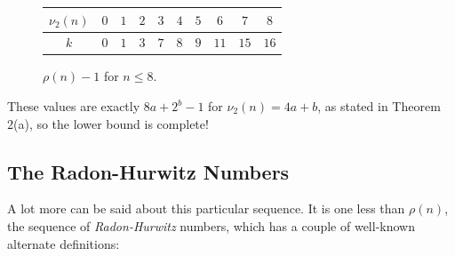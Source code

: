 \documentclass{amsart}
\begin{document}
\begin{figure}[h]
	\begin{center}
		{\tabulinesep=0.6mm
			\begin{tabu}{|c||c|c|c|c|c|c|c|c|c|}
				\hline 
				$\nu_2(n)$ & $0$& $1$& $2$& $3$& $4$& $5$& $6$ &$7$ & $8$\\
				\hline
				$k$ & $0$ & $1$ & $3$ & $7$ & $8$& $9$& $11$ & $15$ & $16$\\
				\hline
		\end{tabu}}
	\end{center}
	\caption{$\rho(n) - 1$ for $n\leq 8$.}
\end{figure}
These values are exactly $8a+2^b - 1$ for $\nu_2(n)=4a+b$, as stated in Theorem 2(a), so the lower bound is complete!\\

\subsection{The Radon-Hurwitz Numbers}
A lot more can be said about this particular sequence. It is one less than $\rho(n)$, the sequence of \textit{Radon-Hurwitz} numbers, which has a couple of well-known alternate definitions:\\
\end{document}

